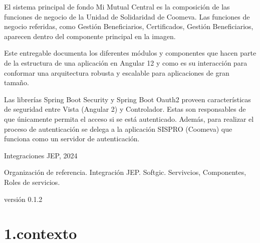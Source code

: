 \documentclass[
  paper=a4,
  ,captions=tableheading
]{scrartcl}
\begin{document}
El sistema principal de fondo Mi Mutual Central es la composición de las
funciones de negocio de la Unidad de Solidaridad de Coomeva. Las
funciones de negocio referidas, como Gestión Beneficiarios,
Certificados, Gestión Beneficiarios, aparecen dentro del componente
principal en la imagen.

Este entregable documenta los diferentes módulos y componentes que hacen
parte de la estructura de una aplicación en Angular 12 y como es su
interacción para conformar una arquitectura robusta y escalable para
aplicaciones de gran tamaño.

Las librerías Spring Boot Security y Spring Boot Oauth2 proveen
características de seguridad entre Vista (Angular 2) y Controlador.
Estas son responsables de que únicamente permita el acceso si se está
autenticado. Además, para realizar el proceso de autenticación se delega
a la aplicación SISPRO (Coomeva) que funciona como un servidor de
autenticación.

Integraciones JEP, 2024

Organización de referencia. Integración JEP. Softgic. Servivcios,
Componentes, Roles de servicios.

versión 0.1.2

\hypertarget{contexto-1}{%
\section{1.contexto}\label{contexto-1}}
\end{document}
